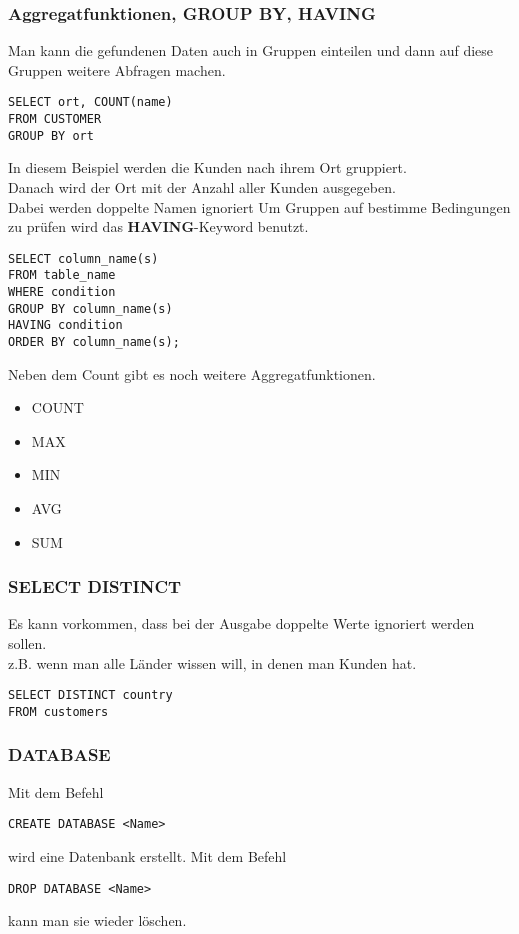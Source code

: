 \documentclass[asp1.tex]{subfiles}
\begin{document}
\subsubsection{Aggregatfunktionen, GROUP BY, HAVING}

Man kann die gefundenen Daten auch in Gruppen einteilen und dann auf diese Gruppen weitere Abfragen machen.
\begin{lstlisting}
SELECT ort, COUNT(name)
FROM CUSTOMER
GROUP BY ort
\end{lstlisting}
In diesem Beispiel werden die Kunden nach ihrem Ort gruppiert. \\
Danach wird der Ort mit der Anzahl aller Kunden ausgegeben. \\
Dabei werden doppelte Namen ignoriert
Um Gruppen  auf bestimme  Bedingungen zu prüfen wird das \textbf{HAVING}-Keyword benutzt. \\

\break

\begin{lstlisting}
SELECT column_name(s)
FROM table_name
WHERE condition
GROUP BY column_name(s)
HAVING condition
ORDER BY column_name(s);
\end{lstlisting}
Neben dem Count gibt es noch weitere Aggregatfunktionen. \\
\begin{itemize}
    \item COUNT
    \item MAX
    \item MIN
    \item AVG
    \item SUM
\end{itemize}

\subsubsection{SELECT DISTINCT}
Es kann vorkommen, dass bei der Ausgabe doppelte Werte ignoriert werden sollen. \\
z.B. wenn man  alle Länder wissen will, in denen man Kunden hat.
\begin{lstlisting}
SELECT DISTINCT country
FROM customers
\end{lstlisting}
\subsubsection{DATABASE}

Mit dem Befehl
\begin{lstlisting}
CREATE DATABASE <Name>
\end{lstlisting}
wird eine Datenbank erstellt.
Mit dem Befehl
\begin{lstlisting}
DROP DATABASE <Name>
\end{lstlisting}
kann man sie wieder löschen.
\end{document}
